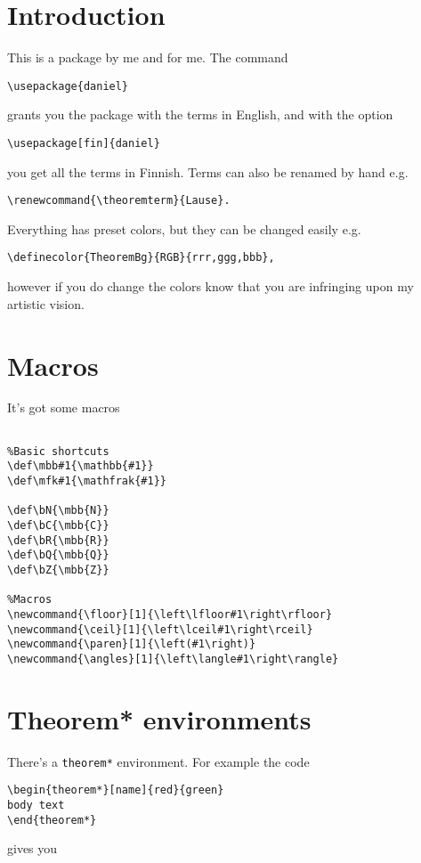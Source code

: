 \documentclass{article}
\begin{document}
\section{Introduction}
This is a package by me and for me.
The command
\begin{verbatim}\usepackage{daniel}\end{verbatim}
grants you the package with the terms in English, and with the option
\begin{verbatim}\usepackage[fin]{daniel}\end{verbatim}
you get all the terms in Finnish.
Terms can also be renamed by hand e.g.
\begin{verbatim}\renewcommand{\theoremterm}{Lause}.\end{verbatim}
Everything has preset colors, but they can be changed easily e.g.
\begin{verbatim}\definecolor{TheoremBg}{RGB}{rrr,ggg,bbb},\end{verbatim}
however if you do change the colors know that you are infringing upon my artistic vision.

\section{Macros}
It's got some macros
\begin{verbatim}

%Basic shortcuts
\def\mbb#1{\mathbb{#1}}
\def\mfk#1{\mathfrak{#1}}

\def\bN{\mbb{N}}
\def\bC{\mbb{C}}
\def\bR{\mbb{R}}
\def\bQ{\mbb{Q}}
\def\bZ{\mbb{Z}}

%Macros
\newcommand{\floor}[1]{\left\lfloor#1\right\rfloor}
\newcommand{\ceil}[1]{\left\lceil#1\right\rceil}
\newcommand{\paren}[1]{\left(#1\right)}
\newcommand{\angles}[1]{\left\langle#1\right\rangle}

\end{verbatim}

\section{Theorem* environments}
There's a \texttt{theorem*} environment. For example the code

\begin{verbatim}
\begin{theorem*}[name]{red}{green}
body text
\end{theorem*}
\end{verbatim}

gives you
\end{document}
